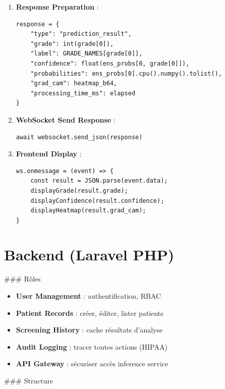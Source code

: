 \documentclass[12pt,a4paper,oneside]{report}
\begin{document}
\begin{enumerate}
    \item \textbf{Response Preparation} :
    \begin{lstlisting}
response = {
    "type": "prediction_result",
    "grade": int(grade[0]),
    "label": GRADE_NAMES[grade[0]],
    "confidence": float(ens_probs[0, grade[0]]),
    "probabilities": ens_probs[0].cpu().numpy().tolist(),
    "grad_cam": heatmap_b64,
    "processing_time_ms": elapsed
}
    \end{lstlisting}
    
    \item \textbf{WebSocket Send Response} :
    \begin{lstlisting}
await websocket.send_json(response)
    \end{lstlisting}
    
    \item \textbf{Frontend Display} :
    \begin{lstlisting}
ws.onmessage = (event) => {
    const result = JSON.parse(event.data);
    displayGrade(result.grade);
    displayConfidence(result.confidence);
    displayHeatmap(result.grad_cam);
}
    \end{lstlisting}
\end{enumerate}

\section{Backend (Laravel PHP)}

### Rôles

\begin{itemize}
    \item \textbf{User Management} : authentification, RBAC
    \item \textbf{Patient Records} : créer, éditer, lister patients
    \item \textbf{Screening History} : cache résultats d'analyse
    \item \textbf{Audit Logging} : tracer toutes actions (HIPAA)
    \item \textbf{API Gateway} : sécuriser accès inference service
\end{itemize}

### Structure
\end{document}

